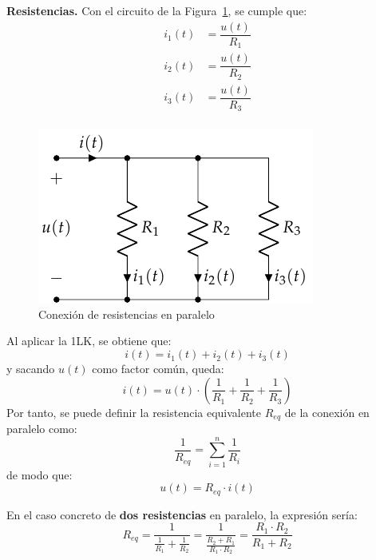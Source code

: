 \documentclass[11pt]{book} %
\numberwithin{dummy}{section}
\theoremstyle{ocrenumbox}
\theoremstyle{blacknumex}
\theoremstyle{blacknumbox}
\theoremstyle{ocrenum}
\newenvironment{remark}{\par\vspace{10pt}\small %
\begin{list}{}{
\leftmargin=35pt %
\rightmargin=25pt}\item\ignorespaces %
\makebox[-2.5pt]{\begin{tikzpicture}[overlay]
\node[draw=ocre!60,line width=1pt,circle,fill=ocre!25,font=\sffamily\bfseries,inner sep=2pt,outer sep=0pt] at (-15pt,0pt){\textcolor{ocre}{N}};\end{tikzpicture}} %
\advance\baselineskip -1pt}{\end{list}\vskip5pt} %
\newlength\esp
\begin{document}
	\begin{itemize}
		\item \textbf{Resistencias.} Con el circuito de la Figura~\ref{fig.resistencias-paralelo}, se cumple que:
		\begin{align*}
			i_1(t) &= \dfrac{u(t)}{R_1}\\
			i_2(t) &= \dfrac{u(t)}{R_2}\\
			i_3(t) &= \dfrac{u(t)}{R_3}\\
		\end{align*}
		\begin{figure}[tbp]
			\centering
			\includegraphics[width=0.35\linewidth]{../figs/AsociacionParalelo.pdf}
			\caption{Conexión de resistencias en paralelo}
			\label{fig.resistencias-paralelo}
		\end{figure}
		Al aplicar la 1LK, se obtiene que: 
		\begin{equation*}
			i(t) = i_1(t) + i_2(t) + i_3(t)
		\end{equation*}
		y sacando $u(t)$ como factor común, queda:
		\begin{equation*}
			i(t) = u(t) \cdot \left(\frac{1}{R_1} + \frac{1}{R_2} + \frac{1}{R_3}\right)
		\end{equation*}
		Por tanto, se puede definir la resistencia equivalente $R_{eq}$ de la conexión en paralelo como:
		\begin{equation}
			\boxed{\dfrac{1}{R_{eq}} = \sum_{i = 1}^n \dfrac{1}{R_i}}
		\end{equation}
		de modo que:
		\begin{equation*}
			u(t) = R_{eq} \cdot i(t)
		\end{equation*}
		
		\begin{remark}
			En el caso concreto de \textbf{dos resistencias} en paralelo, la expresión sería: 
			\begin{equation*}
				R_{eq}=\dfrac{1}{\frac{1}{R_1}+\frac{1}{R_2}}=\dfrac{1}{\frac{R_2+R_1}{R_1\cdot R_2}}=\dfrac{R_1\cdot R_2}{R_1+R_2}
			\end{equation*}
		\end{remark}
		

\end{itemize}
\end{document}

